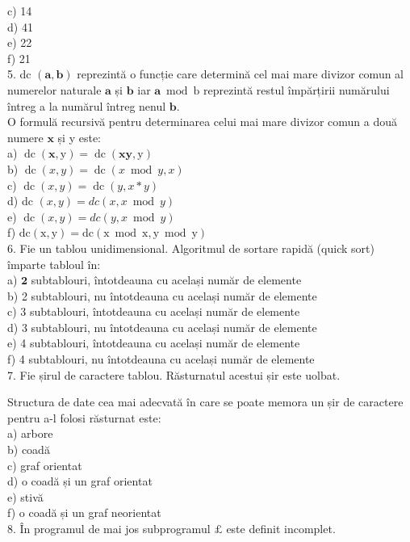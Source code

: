 c) 14\\
d) 41\\
e) 22\\
f) 21\\
5. dc $(\mathbf{a}, \mathbf{b})$ reprezintă o funcție care determină cel mai mare divizor comun al numerelor naturale $\mathbf{a}$ și $\mathbf{b}$ iar $\mathbf{a} \bmod \mathrm{b}$ reprezintă restul împărțirii numărului întreg a la numărul întreg nenul $\mathbf{b}$.\\
O formulă recursivă pentru determinarea celui mai mare divizor comun a două numere $\mathbf{x}$ și y este:\\
a) $\operatorname{dc}(\mathbf{x}, \mathrm{y})=\operatorname{dc}(\mathbf{x} \mathbf{y}, \mathrm{y})$\\
b) $\operatorname{dc}(x, y)=\operatorname{dc}(x \bmod y, x)$\\
c) $\operatorname{dc}(x, y)=\operatorname{dc}(y, x * y)$\\
d) dc $(x, y)=d c(x, x \bmod y)$\\
e) $\operatorname{dc}(x, y)=d c(y, x \bmod y)$\\
f) $\mathrm{dc}(\mathrm{x}, \mathrm{y})=\mathrm{dc}(\mathrm{x} \bmod \mathrm{x}, \mathrm{y} \bmod \mathrm{y})$\\
6. Fie un tablou unidimensional. Algoritmul de sortare rapidă (quick sort) împarte tabloul în:\\
a) $\mathbf{2}$ subtablouri, întotdeauna cu același număr de elemente\\
b) 2 subtablouri, nu întotdeauna cu același număr de elemente\\
c) 3 subtablouri, întotdeauna cu același număr de elemente\\
d) 3 subtablouri, nu întotdeauna cu același număr de elemente\\
e) 4 subtablouri, întotdeauna cu același număr de elemente\\
f) 4 subtablouri, nu întotdeauna cu același număr de elemente\\
7. Fie șirul de caractere tablou. Răsturnatul acestui șir este uolbat.

Structura de date cea mai adecvată în care se poate memora un șir de caractere pentru a-l folosi răsturnat este:\\
a) arbore\\
b) coadă\\
c) graf orientat\\
d) o coadă și un graf orientat\\
e) stivă\\
f) o coadă și un graf neorientat\\
8. În programul de mai jos subprogramul $\pounds$ este definit incomplet.

